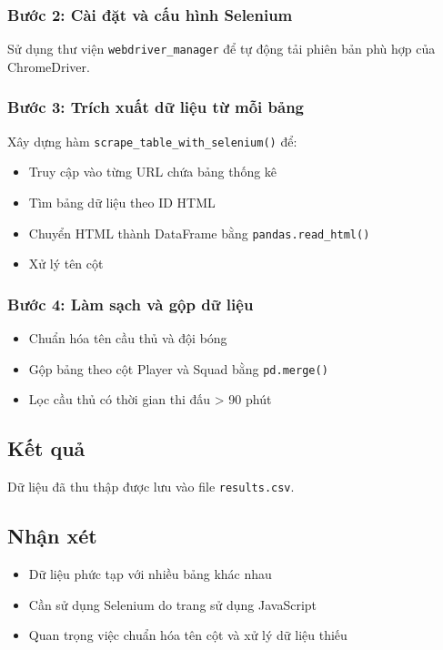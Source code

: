 \documentclass[12pt,a4paper]{article}
\begin{document}
\subsubsection{Bước 2: Cài đặt và cấu hình Selenium}
Sử dụng thư viện \texttt{webdriver\_manager} để tự động tải phiên bản phù hợp của ChromeDriver.

\subsubsection{Bước 3: Trích xuất dữ liệu từ mỗi bảng}
Xây dựng hàm \texttt{scrape\_table\_with\_selenium()} để:
\begin{itemize}
\item Truy cập vào từng URL chứa bảng thống kê
\item Tìm bảng dữ liệu theo ID HTML
\item Chuyển HTML thành DataFrame bằng \texttt{pandas.read\_html()}
\item Xử lý tên cột
\end{itemize}

\subsubsection{Bước 4: Làm sạch và gộp dữ liệu}
\begin{itemize}
\item Chuẩn hóa tên cầu thủ và đội bóng
\item Gộp bảng theo cột Player và Squad bằng \texttt{pd.merge()}
\item Lọc cầu thủ có thời gian thi đấu > 90 phút
\end{itemize}

\subsection{Kết quả}
Dữ liệu đã thu thập được lưu vào file \texttt{results.csv}.

\subsection{Nhận xét}
\begin{itemize}
\item Dữ liệu phức tạp với nhiều bảng khác nhau
\item Cần sử dụng Selenium do trang sử dụng JavaScript
\item Quan trọng việc chuẩn hóa tên cột và xử lý dữ liệu thiếu
\end{itemize}
\end{document}
